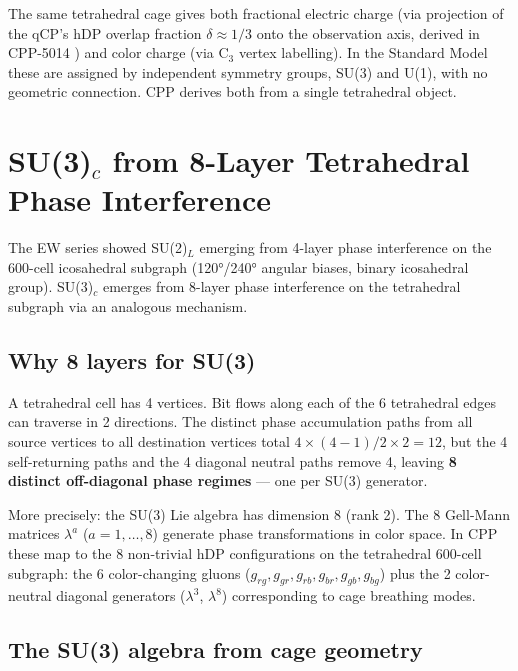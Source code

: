 \documentclass[11pt,a4paper]{article}
\begin{document}
The same tetrahedral cage gives both fractional electric charge
(via projection of the qCP's hDP overlap fraction $\delta \approx
1/3$ onto the observation axis, derived in CPP-5014 \citep{cpp5014})
and color charge (via C$_3$ vertex labelling).  In the Standard
Model these are assigned by independent symmetry groups, SU(3) and
U(1), with no geometric connection.  CPP derives both from a single
tetrahedral object.

\section{SU(3)$_c$ from 8-Layer Tetrahedral Phase Interference}
\label{sec:su3}

The EW series showed SU(2)$_L$ emerging from 4-layer phase
interference on the 600-cell icosahedral subgraph (120°/240°
angular biases, binary icosahedral group).  SU(3)$_c$ emerges from
8-layer phase interference on the tetrahedral subgraph via an
analogous mechanism.

\subsection{Why 8 layers for SU(3)}

A tetrahedral cell has 4 vertices.  Bit flows along each of the 6
tetrahedral edges can traverse in 2 directions.  The distinct phase
accumulation paths from all source vertices to all destination
vertices total $4 \times (4-1)/2 \times 2 = 12$, but the 4
self-returning paths and the 4 diagonal neutral paths remove 4,
leaving \textbf{8 distinct off-diagonal phase regimes} --- one per
SU(3) generator.

More precisely: the SU(3) Lie algebra has dimension 8 (rank 2).
The 8 Gell-Mann matrices $\lambda^a$ ($a=1,\ldots,8$) generate
phase transformations in color space.  In CPP these map to the 8
non-trivial hDP configurations on the tetrahedral 600-cell subgraph:
the 6 color-changing gluons ($g_{rg}, g_{gr}, g_{rb}, g_{br},
g_{gb}, g_{bg}$) plus the 2 color-neutral diagonal generators
($\lambda^3$, $\lambda^8$) corresponding to cage breathing modes.

\subsection{The SU(3) algebra from cage geometry}
\end{document}
